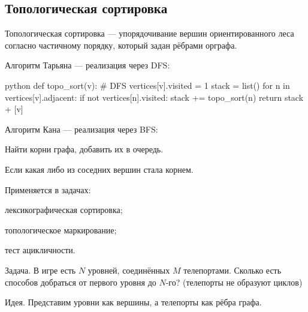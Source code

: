 \subsection{Топологическая сортировка}

{\bold Топологическая сортировка} --- упорядочивание вершин ориентированного леса согласно {\ital частичному порядку}, который задан рёбрами орграфа. 

{\bold Алгоритм Тарьяна} --- реализация через {\ital DFS}:

\begin{code}{python}
def topo_sort(v): # DFS
  vertices[v].visited = 1
  stack = list()
  for n in vertices[v].adjacent:
    if not vertices[n].visited:
      stack += topo_sort(n)
  return stack + [v]
\end{code}

{\bold Алгоритм Кана} --- реализация через {\ital BFS}:


\begin{list*}[][\#]
\item Найти {\ital корни} графа, добавить их в очередь.
\item Если какая либо из соседних вершин стала {\ital корнем}.
\end{list*}

Применяется в {\bold задачах}:

\begin{list*}
\item лексикографическая сортировка;
\item топологическое маркирование;
\item тест ацикличности.
\end{list*}

\begin{theorem}
{\bold Задача.} В игре есть $N$ уровней, соединённых $M$ телепортами. Сколько есть способов добраться от первого уровня до $N$-го? {\ital\color{desc}(телепорты не образуют циклов)}
\end{theorem}

{\bold Идея.} Представим уровни как вершины, а телепорты как рёбра графа.

